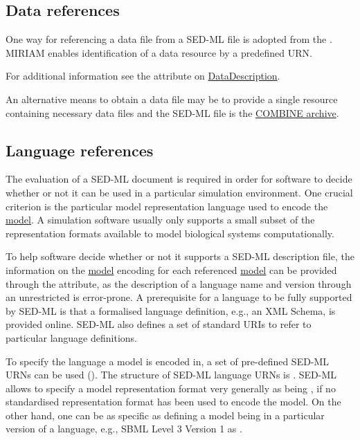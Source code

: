 \subsection{Data references}
\label{sec:dataURI}
One way for referencing a data file from a SED-ML file is adopted from the . MIRIAM enables identification of a data resource by a predefined URN. 

For additional information see the \hyperref[sec:data_source]{} attribute on \hyperref[class:dataDescription]{DataDescription}.

An alternative means to obtain a data file may be to provide a single resource containing necessary data files and the SED-ML file is the \hyperref[sec:archive]{COMBINE archive}. 


\subsection{Language references}
\label{sec:languageURI}
The evaluation of a SED-ML document is required in order for software to decide whether or not it can be used in a particular simulation environment. One crucial criterion is the particular model representation language used to encode the \hyperref[class:model]{model}. A simulation software usually only supports a small subset of the representation formats available to model biological systems computationally. 

To help  software decide whether or not it supports a SED-ML description file, the information on the \hyperref[class:model]{model} encoding for each referenced \hyperref[class:model]{model} can be provided through the \hyperref[sec:language]{} attribute, as the description of a language name and version through an unrestricted  is error-prone. 
A prerequisite for a language to be fully supported by SED-ML is that a formalised language definition, e.g., an XML Schema, is provided online. SED-ML also defines a set of standard URIs to refer to particular language definitions. 

To specify the language a model is encoded in, a set of pre-defined SED-ML URNs can be used (). The structure of SED-ML language URNs is \emph{}. SED-ML allows to specify a model representation format very generally as being , if no standardised representation format has been used to encode the model. On the other hand, one can be as specific as defining a model being in a particular version of a language, e.g., SBML Level 3 Version 1 as .

